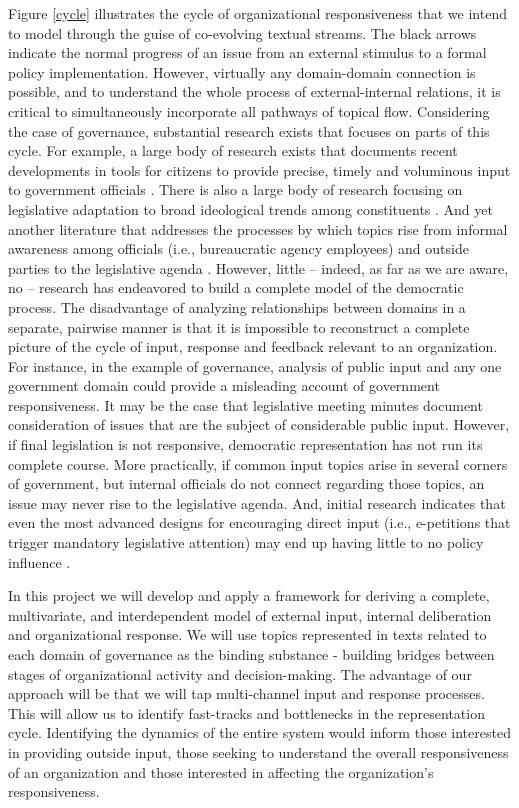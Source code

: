 Figure \ref{cycle} illustrates the cycle of organizational responsiveness that we intend to model through the guise of co-evolving textual streams. The black arrows indicate the normal progress of an issue from an external stimulus to a formal policy implementation. However, virtually any domain-domain connection is possible, and to understand the whole process of external-internal relations, it is critical to simultaneously incorporate all pathways of topical flow. Considering the case of governance, substantial research exists that focuses on parts of this cycle. For example, a large body of research exists that documents recent developments in tools for citizens to provide precise, timely and voluminous input to government officials  \cite{Tatkeiho2002,Andersen2006,Yildiz2007}. There is also a large body of research focusing on legislative adaptation to broad ideological trends among constituents \cite{MIller1963,Canes-Wrone2002,Levendusky2008}.  And yet another literature that addresses the processes by which topics rise from informal awareness among officials (i.e., bureaucratic agency employees) and outside parties to the legislative agenda \cite{Baumgartner1993,Wood1991,Furlong1998}. However, little -- indeed, as far as we are aware, no -- research has endeavored to build a complete model of the democratic process. The disadvantage of analyzing relationships between domains in a separate, pairwise manner is that it is impossible to reconstruct a complete picture of the cycle of input, response and feedback relevant to an organization.  For instance, in the example of governance, analysis of public input and any one government domain could provide a misleading account of government responsiveness. It may be the case that legislative meeting minutes document consideration of issues that are the subject of considerable public input. However, if final legislation is not responsive, democratic representation has not run its complete course. More practically, if common input topics arise in several corners of government, but internal officials do not connect regarding those topics, an issue may never rise to the legislative agenda. And, initial research indicates that even the most advanced designs for encouraging direct input (i.e., e-petitions that trigger mandatory legislative attention) may end up having little to no policy influence \cite{Hough2012}.

In this project we will develop and apply a framework for deriving a complete, multivariate, and interdependent model of external input, internal deliberation and organizational response.  We will use topics represented in texts related to each domain of governance as the binding substance - building bridges between stages of organizational activity and decision-making. The advantage of our approach will be that we will tap multi-channel input and response processes. This will allow us to identify fast-tracks and bottlenecks in the representation cycle. Identifying the dynamics of the entire system would inform those interested in providing outside input, those seeking to understand the overall responsiveness of an organization and those interested in affecting the organization's responsiveness. 



